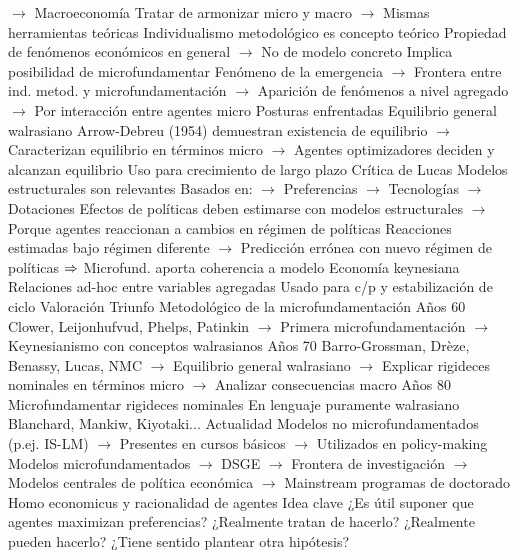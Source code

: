 \documentclass{nuevotema}
\begin{document}
\begin{esquemal}
				\4[] $\to$ Macroeconomía
				\4[] Tratar de armonizar micro y macro
				\4[] $\to$ Mismas herramientas teóricas
				\4 Individualismo metodológico es concepto teórico
				\4[] Propiedad de fenómenos económicos en general
				\4[] $\to$ No de modelo concreto
				\4[] Implica posibilidad de microfundamentar
				\4[] Fenómeno de la emergencia
				\4[] $\to$ Frontera entre ind. metod. y microfundamentación
				\4[] $\to$ Aparición de fenómenos a nivel agregado
				\4[] $\to$ Por interacción entre agentes micro
			\3 Posturas enfrentadas
				\4 Equilibrio general walrasiano
				\4[] Arrow-Debreu (1954) demuestran existencia de equilibrio
				\4[] $\to$ Caracterizan equilibrio en términos micro
				\4[] $\to$ Agentes optimizadores deciden y alcanzan equilibrio
				\4[] Uso para crecimiento de largo plazo
				\4 Crítica de Lucas
				\4[] Modelos estructurales son relevantes
				\4[] Basados en:
				\4[] $\to$ Preferencias
				\4[] $\to$ Tecnologías
				\4[] $\to$ Dotaciones
				\4[] Efectos de políticas deben estimarse con modelos estructurales
				\4[] $\to$ Porque agentes reaccionan a cambios en régimen de políticas
				\4[] Reacciones estimadas bajo régimen diferente
				\4[] $\to$ Predicción errónea con nuevo régimen de políticas
				\4[] $\Rightarrow$ Microfund. aporta coherencia a modelo
				\4 Economía keynesiana
				\4[] Relaciones ad-hoc entre variables agregadas
				\4[] Usado para c/p y estabilización de ciclo
			\3 Valoración
				\4 Triunfo Metodológico de la microfundamentación
				\4 Años 60
				\4[] Clower, Leijonhufvud, Phelps, Patinkin
				\4[] $\to$ Primera microfundamentación
				\4[] $\to$ Keynesianismo con conceptos walrasianos
				\4 Años 70
				\4[] Barro-Grossman, Drèze, Benassy, Lucas, NMC
				\4[] $\to$ Equilibrio general walrasiano
				\4[] $\to$ Explicar rigideces nominales en términos micro
				\4[] $\to$ Analizar consecuencias macro
				\4 Años 80
				\4[] Microfundamentar rigideces nominales
				\4[] En lenguaje puramente walrasiano
				\4[] Blanchard, Mankiw, Kiyotaki...
				\4 Actualidad
				\4[] Modelos no microfundamentados (p.ej. IS-LM)
				\4[] $\to$ Presentes en cursos básicos
				\4[] $\to$ Utilizados en policy-making
				\4[] Modelos microfundamentados
				\4[] $\to$ DSGE
				\4[] $\to$ Frontera de investigación
				\4[] $\to$ Modelos centrales de política económica
				\4[] $\to$ Mainstream programas de doctorado
		\2 Homo economicus y racionalidad de agentes
			\3 Idea clave
				\4 ¿Es útil suponer que agentes maximizan preferencias?
				\4[] ¿Realmente tratan de hacerlo?
				\4[] ¿Realmente pueden hacerlo?
				\4[] ¿Tiene sentido plantear otra hipótesis?

\end{esquemal}
\end{document}
